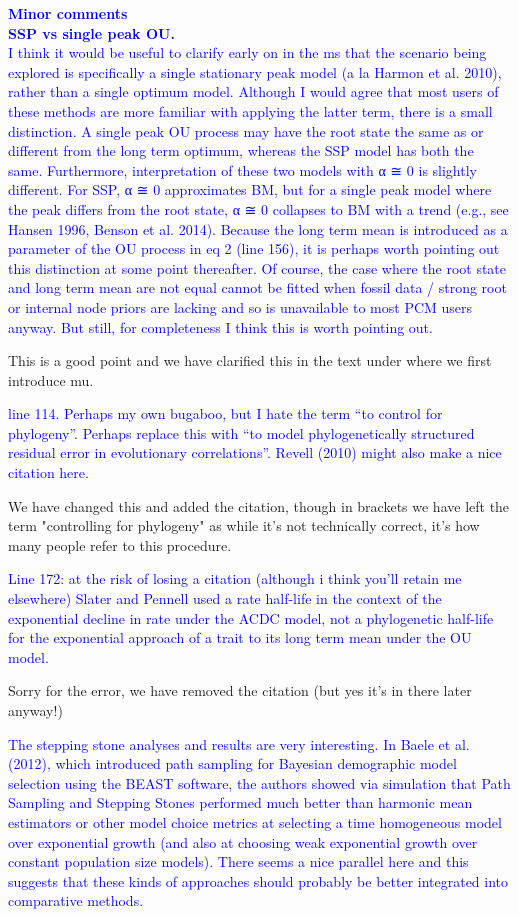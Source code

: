 \documentclass[12pt]{letter}
\begin{document}
\begin{letter}{}
\textcolor{blue}{\textbf{Minor comments}\\
\textbf{SSP vs single peak OU.}\\
I think it would be useful to clarify early on in the ms that the scenario being explored is specifically a single stationary peak model (a la Harmon et al. 2010), rather than a single optimum model. Although I would agree that most users of these methods are more familiar with applying the latter term, there is a small distinction. A single peak OU process may have the root state the same as or different from the long term optimum, whereas the SSP model has both the same. Furthermore, interpretation of these two models with α ≅ 0 is slightly different. For SSP, α ≅ 0 approximates BM, but for a single peak model where the peak differs from the root state, α ≅ 0 collapses to BM with a trend (e.g., see Hansen 1996, Benson et al. 2014). Because the long term mean is introduced as a parameter of the OU process in eq 2 (line 156), it is perhaps worth pointing out this distinction at some point thereafter. Of course, the case where the root state and long term mean are not equal cannot be fitted when fossil data / strong root or internal node priors are lacking and so is unavailable to most PCM users anyway. But still, for completeness I think this is worth pointing out.}

This is a good point and we have clarified this in the text under where we first introduce mu. 

\textcolor{blue}{line 114. Perhaps my own bugaboo, but I hate the term “to control for phylogeny”. Perhaps replace this with “to model phylogenetically structured residual error in evolutionary correlations”. Revell (2010) might also make a nice citation here.}

We have changed this and added the citation, though in brackets we have left the term "controlling for phylogeny"
 as while it's not technically correct, it's how many people refer to this procedure.

\textcolor{blue}{Line 172: at the risk of losing a citation (although i think you’ll retain me elsewhere) Slater and Pennell used a rate half-life in the context of the exponential decline in rate under the ACDC model, not a phylogenetic half-life for the exponential approach of a trait to its long term mean under the OU model.}

Sorry for the error, we have removed the citation (but yes it's in there later anyway!)

\textcolor{blue}{The stepping stone analyses and results are very interesting. In Baele et al. (2012), which introduced path sampling for Bayesian demographic model selection using the BEAST software, the authors showed via simulation that Path Sampling and Stepping Stones performed much better than harmonic mean estimators or other model choice metrics at selecting a time homogeneous model over exponential growth (and also at choosing weak exponential growth over constant population size models). There seems a nice parallel here and this suggests that these kinds of approaches should probably be better integrated into comparative methods.}


\end{letter}
\end{document}
